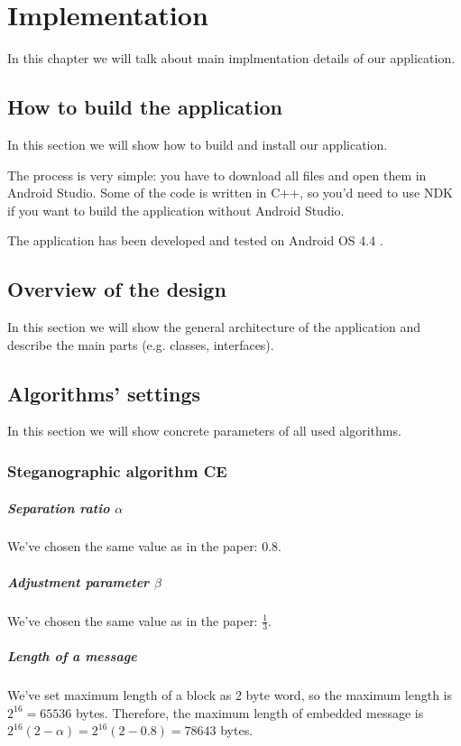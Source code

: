 \chapter{Implementation}

In this chapter we will talk about main implmentation details of
our application.

\section{How to build the application}
In this section we will show how to build and install our application.

The process is very simple: you have to download all files and open them
in Android Studio. Some of the code is written in C++, so you'd need to 
use NDK if you want to build the application without Android Studio.

The application has been developed and tested on Android OS 4.4 .

\section{Overview of the design}
In this section we will show the general architecture of the application
and describe the main parts (e.g. classes, interfaces).

\TODO 


\section{Algorithms' settings}
In this section we will show concrete parameters of all used algorithms.

\subsection{Steganographic algorithm CE}

\paragraph{Separation ratio $\alpha$} We've chosen the same value as in the 
paper: $0.8$.
\paragraph{Adjustment parameter $\beta$} We've chosen the same value as in the paper: $\frac{1}{3}$.
\paragraph{Length of a message}
We've set maximum length of a block as 2 byte word, so the maximum length is 
$2^{16} = 65536$ bytes. Therefore, the maximum length of embedded message is 
$2^{16} (2 - \alpha) = 2^{16} (2 - 0.8) = 78643$ bytes.

